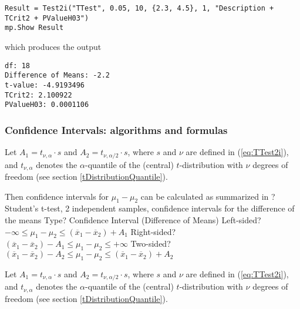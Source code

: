\begin{lstlisting}
Result = Test2i("TTest", 0.05, 10, {2.3, 4.5}, 1, "Description + TCrit2 + PValueH03")
mp.Show Result
\end{lstlisting}
which produces the output

\begin{verbatim}
df: 18
Difference of Means: -2.2
t-value: -4.9193496
TCrit2: 2.100922
PValueH03: 0.0001106
\end{verbatim}




\subsubsection{Confidence Intervals: algorithms and formulas}
\label{2iSampleTTest_CI}

Let $A_1=t_{\nu,\alpha} \cdot s$ and $A_2=t_{\nu,\alpha/2} \cdot s$, where $s$ and $\nu$ are defined in (\ref{eq:TTest2i}), and $t_{\nu,\alpha}$ denotes the $\alpha$-quantile of the (central) $t$-distribution with $\nu$ degrees of freedom (see section \ref{tDistributionQuantile}). 


\mpTableTwoColsThreeRows
{Then confidence intervals for $\mu_1 - \mu_2$ can be calculated as summarized in ? Student's t-test, 2 independent samples, confidence intervals for the difference of the means}
{Type? Confidence Interval (Difference of Means)}
{Left-sided? $-\infty \leq \mu_1 - \mu_2 \leq (\overline{x}_1-\overline{x}_2) + A_1$}
{Right-sided? $(\overline{x}_1-\overline{x}_2) - A_1 \leq \mu_1 - \mu_2 \leq +\infty$}
{Two-sided? $(\overline{x}_1-\overline{x}_2) - A_2 \leq \mu_1 - \mu_2 \leq (\overline{x}_1-\overline{x}_2) + A_2$}


Let $A_1=t_{\nu,\alpha} \cdot s$ and $A_2=t_{\nu,\alpha/2} \cdot s$, where $s$ and $\nu$ are defined in (\ref{eq:TTest2i}), and $t_{\nu,\alpha}$ denotes the $\alpha$-quantile of the (central) $t$-distribution with $\nu$ degrees of freedom (see section \ref{tDistributionQuantile}). 

%


